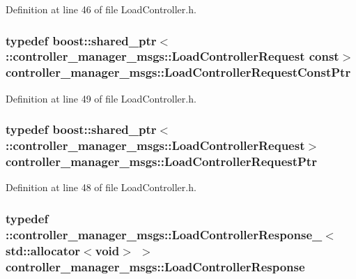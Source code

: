 \-Definition at line 46 of file \-Load\-Controller.\-h.

\subsubsection[{\-Load\-Controller\-Request\-Const\-Ptr}]{\setlength{\rightskip}{0pt plus 5cm}typedef boost\-::shared\-\_\-ptr$<$ \-::{\bf controller\-\_\-manager\-\_\-msgs\-::\-Load\-Controller\-Request} const$>$ {\bf controller\-\_\-manager\-\_\-msgs\-::\-Load\-Controller\-Request\-Const\-Ptr}}\label{namespacecontroller__manager__msgs_af1eec5bec570c4ad113236f2287f2a22}


\-Definition at line 49 of file \-Load\-Controller.\-h.

\subsubsection[{\-Load\-Controller\-Request\-Ptr}]{\setlength{\rightskip}{0pt plus 5cm}typedef boost\-::shared\-\_\-ptr$<$ \-::{\bf controller\-\_\-manager\-\_\-msgs\-::\-Load\-Controller\-Request}$>$ {\bf controller\-\_\-manager\-\_\-msgs\-::\-Load\-Controller\-Request\-Ptr}}\label{namespacecontroller__manager__msgs_a6d3b20072cf7c5ed29c8acc1f43c7be2}


\-Definition at line 48 of file \-Load\-Controller.\-h.

\subsubsection[{\-Load\-Controller\-Response}]{\setlength{\rightskip}{0pt plus 5cm}typedef \-::{\bf controller\-\_\-manager\-\_\-msgs\-::\-Load\-Controller\-Response\-\_\-}$<$std\-::allocator$<$void$>$ $>$ {\bf controller\-\_\-manager\-\_\-msgs\-::\-Load\-Controller\-Response}}\label{namespacecontroller__manager__msgs_af9dab7de6500e6edd42b477a8cf1b3f6}


